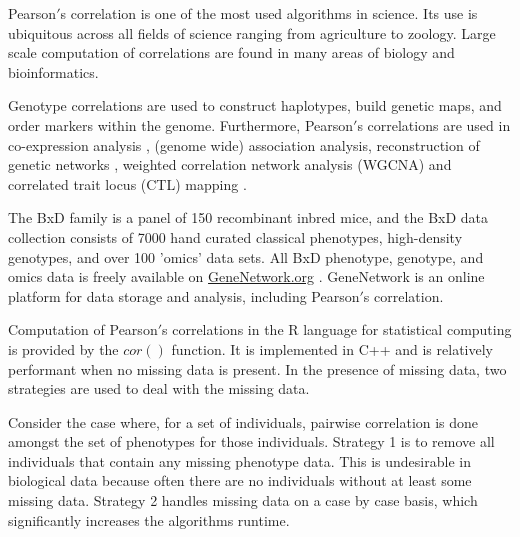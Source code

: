 \documentclass{bioinfo}
\begin{document}

\enlargethispage{12pt}

Pearson$'$s correlation is one of the most used algorithms in
science. Its use is ubiquitous across all fields of science ranging
from agriculture to zoology. Large scale computation of correlations
are found in many areas of biology and bioinformatics.

Genotype correlations are used to construct haplotypes, build genetic
maps, and order markers within the genome. Furthermore, Pearson$'$s
correlations are used in co-expression analysis \citep{Tesson:2010},
(genome wide) association analysis, reconstruction of genetic
networks \citep{Fukushima:2013}, weighted correlation network analysis
(WGCNA) \citep{Horvath:2008} and correlated trait locus (CTL)
mapping \citep{Arends2016a}.

The BxD family is a panel of 150 recombinant inbred mice, and the BxD
data collection consists of 7000 hand curated classical phenotypes,
high-density genotypes, and over 100 'omics' data sets. All BxD
phenotype, genotype, and omics data is freely available on
\href{https://genenetwork.org/}{GeneNetwork.org} \citep{Sloan2016}.
GeneNetwork is an online platform for data storage and analysis,
including Pearson$'$s correlation.

Computation of Pearson$'$s correlations in the R language for
statistical computing \citep{R:2005} is provided by the $cor()$
function. It is implemented in C++ and is relatively performant when
no missing data is present. In the presence of missing data, two
strategies are used to deal with the missing data.

Consider the case where, for a set of individuals, pairwise
correlation is done amongst the set of phenotypes for those
individuals. Strategy 1 is to remove all individuals that contain any
missing phenotype data. This is undesirable in biological data because
often there are no individuals without at least some missing
data. Strategy 2 handles missing data on a case by case basis, which
significantly increases the algorithms runtime.
\end{document}

